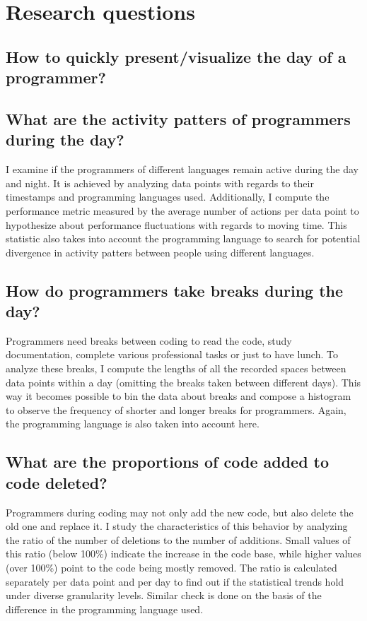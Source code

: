 \section{Research questions}

\subsection{How to quickly present/visualize the day of a programmer?}

\subsection{What are the activity patters of programmers during the day?}

I examine if the programmers of different languages remain active during the day and night. It is achieved by analyzing data points with regards to their timestamps and programming languages used. Additionally, I compute the performance metric measured by the average number of actions per data point to hypothesize about performance fluctuations with regards to moving time. This statistic also takes into account the programming language to search for potential divergence in activity patters between people using different languages.

\subsection{How do programmers take breaks during the day?}

Programmers need breaks between coding to read the code, study documentation, complete various professional tasks or just to have lunch. To analyze these breaks, I compute the lengths of all the recorded spaces between data points within a day (omitting the breaks taken between different days). This way it becomes possible to bin the data about breaks and compose a histogram to observe the frequency of shorter and longer breaks for programmers. Again, the programming language is also taken into account here.

\subsection{What are the proportions of code added to code deleted?}

Programmers during coding may not only add the new code, but also delete the old one and replace it. I study the characteristics of this behavior by analyzing the ratio of the number of deletions to the number of additions. Small values of this ratio (below 100\%) indicate the increase in the code base, while higher values (over 100\%) point to the code being mostly removed. The ratio is calculated separately per data point and per day to find out if the statistical trends hold under diverse granularity levels. Similar check is done on the basis of the difference in the programming language used.

